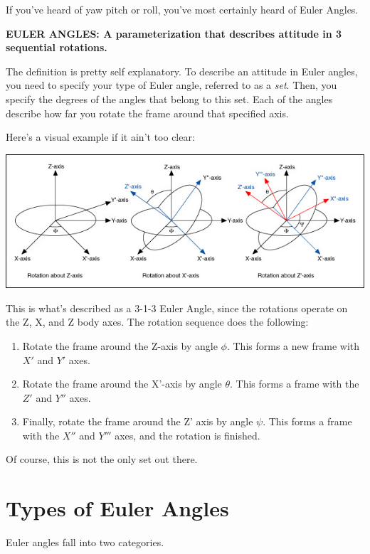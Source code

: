 \documentclass[a4paper,14pt]{extreport}
\begin{document}
If you've heard of yaw pitch or roll, you've most certainly heard of Euler Angles.
\begin{center}
\textbf{EULER ANGLES: A parameterization that describes attitude in 3 sequential rotations.}
\end{center}

The definition is pretty self explanatory. To describe an attitude in Euler angles, you need to specify your type of Euler angle, referred to as a \emph{set}. Then, you specify the degrees of the angles that belong to this set. Each of the angles describe how far you rotate the frame around that specified axis. 

Here's a visual example if it ain't too clear:

\begin{center}
\includegraphics[width=16cm]{euler_proper}
\end{center}

This is what's described as a 3-1-3 Euler Angle, since the rotations operate on the Z, X, and Z body axes. The rotation sequence does the following:
\begin{enumerate}
\item Rotate the frame around the Z-axis by angle $\phi$. This forms a new frame with $X'$ and $Y'$ axes.
\item Rotate the frame around the X'-axis by angle $\theta$. This forms a frame with the $Z'$ and $Y''$ axes.
\item Finally, rotate the frame around the Z' axis by angle $\psi$. This forms a frame with the $X''$ and $Y'''$ axes, and the rotation is finished.
\end{enumerate}

Of course, this is not the only set out there.

\section{Types of Euler Angles}
Euler angles fall into two categories.
\end{document}
